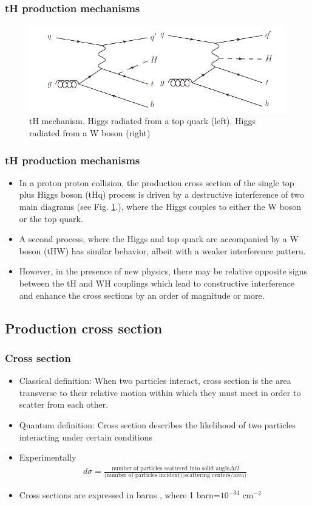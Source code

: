 \documentclass[11pt]{beamer}
\begin{document}
\begin{frame}
\frametitle{tH production mechanisms}
\begin{center}
\begin{figure} 
\includegraphics[scale=0.4]{figures/tq.png} 
\caption{tH mechanism. Higgs radiated from a top quark (left). Higgs radiated from a W boson (right)} 
\label{th}
\end{figure}
\end{center}
\end{frame}

\begin{frame}
\frametitle{tH production mechanisms}
\begin{itemize}
\item In a proton proton collision, the production cross section of the single top plus Higgs boson (tHq) process is driven by a
destructive interference of two main diagrams (see Fig. \ref{th}.), where the Higgs couples to either
the W boson or the top quark. 
\item  A second process, where the Higgs and top quark
are accompanied by a W boson (tHW) has similar behavior, albeit with a weaker interference
pattern.
\item However, in the presence of new physics, there may be relative opposite signs between the tH
and WH couplings which lead to constructive interference and enhance the cross sections by
an order of magnitude or more.
\end{itemize}
\end{frame}


\begin{frame}
\section{Production cross section}
\frametitle{Cross section}
\begin{itemize}
\item Classical definition: When two particles interact, cross section is the area transverse to their relative motion within
which they must meet in order to scatter from each other.
\item Quantum definition: Cross section describes the likelihood of two particles interacting under certain conditions\cite{1}
\item Experimentally
\begin{align}
d\sigma=\frac{\text{number of particles scattered into solid angle} \Delta\Omega}{\text{(number of particles incident)(scattering centers/area)}}
\end{align}
\item Cross sections are expressed in barns , where 1 barn=$10^{-34}$ cm$^{-2}$ 
\end{itemize}
\end{frame}
\end{document}
